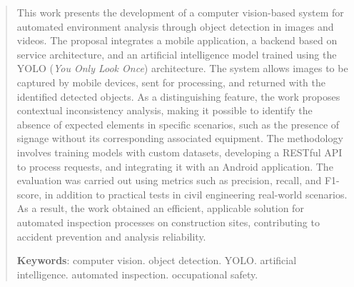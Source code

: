 \documentclass[
	12pt,				%
	openright,			%
	oneside,			%
	a4paper,			%
	chapter=TITLE,		%
	english,			%
	brazil				%
	]{abntex2}
\begin{document}
\renewcommand{\abstractname}{ABSTRACT}
\renewcommand{\resumoname}{ABSTRACT}
\begin{abstract}
  This work presents the development of a computer vision-based system for automated environment analysis through object detection in images and videos. The proposal integrates a mobile application, a backend based on service architecture, and an artificial intelligence model trained using the YOLO (\textit{You Only Look Once}) architecture. The system allows images to be captured by mobile devices, sent for processing, and returned with the identified detected objects. As a distinguishing feature, the work proposes contextual inconsistency analysis, making it possible to identify the absence of expected elements in specific scenarios, such as the presence of signage without its corresponding associated equipment. The methodology involves training models with custom datasets, developing a RESTful API to process requests, and integrating it with an Android application. The evaluation was carried out using metrics such as precision, recall, and F1-score, in addition to practical tests in civil engineering real-world scenarios. As a result, the work obtained an efficient, applicable solution for automated inspection processes on construction sites, contributing to accident prevention and analysis reliability.
  
  \vspace{\onelineskip}
  \noindent
  \textbf{Keywords}: computer vision. object detection. YOLO. artificial intelligence. automated inspection. occupational safety.
\end{abstract}

\cleardoublepage

\listoffigures*
\cleardoublepage

\listoftables*
\cleardoublepage


\tableofcontents*
\cleardoublepage

\textual







\postextual





\begin{anexos}

\end{anexos}
\end{document}
